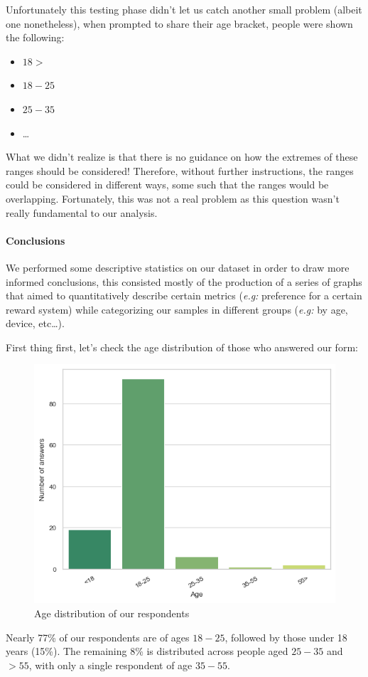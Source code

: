 \documentclass[a4paper, 11pt]{report}
\begin{document}
Unfortunately this testing phase didn't let us catch another small problem (albeit one nonetheless),
when prompted to share their age bracket, people were shown the following:
\begin{itemize}
	\item $18>$
	\item $18-25$
	\item $25-35$
	\item \dots
\end{itemize}

What we didn't realize is that there is no guidance on how the extremes of these ranges should be considered!
Therefore, without further instructions, the ranges could be considered in different ways, some such that
the ranges would be overlapping.
Fortunately, this was not a real problem as this question wasn't really fundamental to our analysis.

\paragraph{Conclusions}
We performed some descriptive statistics on our dataset in order to draw more informed conclusions,
this consisted mostly of the production of a series of graphs that aimed to quantitatively
describe certain metrics (\emph{e.g:} preference for a certain reward system) while categorizing
our samples in different groups (\emph{e.g:} by age, device, etc\dots).


First thing first, let's check the age distribution of those who answered our form:

\begin{figure}[H]
	\centering
 	\includegraphics[width=.5\textwidth]{img/analysis/age_distribution.png}
 	\caption{Age distribution of our respondents}
\end{figure}

Nearly 77\% of our respondents are of ages $18-25$, followed by those under 18 years (15\%). The remaining 8\% is distributed across people aged 
$25-35$ and $>55$, with only a single respondent of age $35-55$. 
\end{document}
